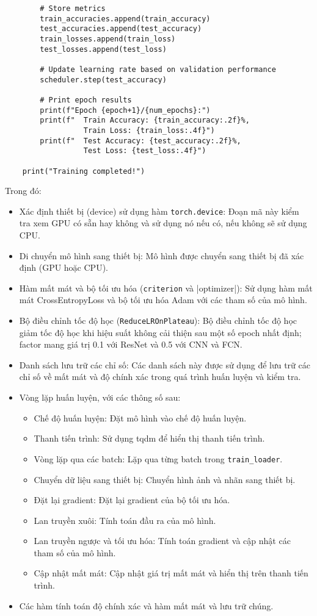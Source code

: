 \documentclass[../main.tex]{subfiles}
\begin{document}
\begin{verbatim}
        # Store metrics
        train_accuracies.append(train_accuracy)
        test_accuracies.append(test_accuracy)
        train_losses.append(train_loss)
        test_losses.append(test_loss)
        
        # Update learning rate based on validation performance
        scheduler.step(test_accuracy)
        
        # Print epoch results
        print(f"Epoch {epoch+1}/{num_epochs}:")
        print(f"  Train Accuracy: {train_accuracy:.2f}%, 
                  Train Loss: {train_loss:.4f}")
        print(f"  Test Accuracy: {test_accuracy:.2f}%, 
                  Test Loss: {test_loss:.4f}")
    
    print("Training completed!")
\end{verbatim}

Trong đó:

\begin{itemize}
    \item Xác định thiết bị (device) sử dụng hàm \verb|torch.device|: Đoạn mã này kiểm tra xem GPU có sẵn hay không và sử dụng nó nếu có, nếu không sẽ sử dụng CPU.
    \item Di chuyển mô hình sang thiết bị: Mô hình được chuyển sang thiết bị đã xác định (GPU hoặc CPU).
    \item Hàm mất mát và bộ tối ưu hóa (\verb|criterion| và |optimizer|): Sử dụng hàm mất mát CrossEntropyLoss và bộ tối ưu hóa Adam với các tham số của mô hình.
    \item Bộ điều chỉnh tốc độ học (\verb|ReduceLROnPlateau|): Bộ điều chỉnh tốc độ học giảm tốc độ học khi hiệu suất không cải thiện sau một số epoch nhất định; factor mang giá trị 0.1 với ResNet và 0.5 với CNN và FCN.
    \item Danh sách lưu trữ các chỉ số: Các danh sách này được sử dụng để lưu trữ các chỉ số về mất mát và độ chính xác trong quá trình huấn luyện và kiểm tra.
    \item Vòng lặp huấn luyện, với các thông số sau:
    \begin{itemize}
        \item Chế độ huấn luyện: Đặt mô hình vào chế độ huấn luyện.
        \item Thanh tiến trình: Sử dụng tqdm để hiển thị thanh tiến trình.
        \item Vòng lặp qua các batch: Lặp qua từng batch trong \verb|train_loader|.
        \item Chuyển dữ liệu sang thiết bị: Chuyển hình ảnh và nhãn sang thiết bị.
        \item Đặt lại gradient: Đặt lại gradient của bộ tối ưu hóa.
        \item Lan truyền xuôi: Tính toán đầu ra của mô hình.
        \item Lan truyền ngược và tối ưu hóa: Tính toán gradient và cập nhật các tham số của mô hình.
        \item Cập nhật mất mát: Cập nhật giá trị mất mát và hiển thị trên thanh tiến trình.
    \end{itemize}
    \item Các hàm tính toán độ chính xác và hàm mất mát và lưu trữ chúng.
\end{itemize}
\end{document}
